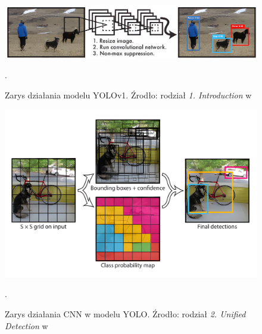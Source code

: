 \begin{figure}[H]
    \centering
    \includegraphics[width=\linewidth]{r_technologie/AI_assets/yolov1_1.png}
    \caption{Zarys działania modelu YOLOv1. Źrodło: rodział \emph{1. Introduction} w \cite{yolo_pierwszy_artykul}} .
    \label{fig:yolov1-schemat-dzialania}
\end{figure}
\begin{figure}[H]
    \centering
    \includegraphics[width=\linewidth]{r_technologie/AI_assets/yolov1_2.png}
    \caption{Zarys działania CNN w modelu YOLO. Źrodło: rodział \emph{2. Unified Detection} w \cite{yolo_pierwszy_artykul}} .
    \label{fig:yolov1-schemat-dzialania-CNN}
\end{figure}



